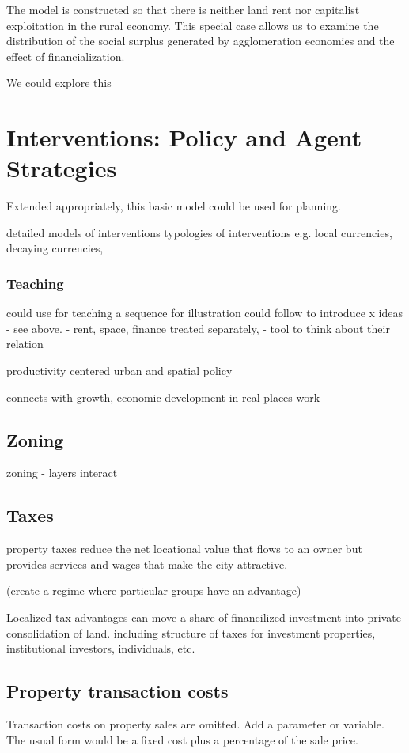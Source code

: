 The model is constructed so that there is neither land rent nor capitalist exploitation in the rural economy. 
This special case allows us to examine the distribution of the social surplus generated by agglomeration economies and the effect of financialization.

We could explore this

\section{Interventions: Policy and Agent Strategies}
Extended appropriately, this basic model could be used for planning.

detailed models of interventions typologies of interventions e.g. local currencies, decaying currencies, 

\subsubsection{Teaching}
could use for teaching a sequence for illustration could follow to introduce x ideas - see above. - rent, space, finance treated separately, - tool to think about their relation

productivity centered urban and spatial policy

connects with growth, economic development in real places work

\subsection{Zoning}
zoning - layers interact

\subsection{Taxes}
property taxes reduce the net locational value that flows to an owner but provides services and wages that make the city attractive. 

(create a regime where particular groups have an advantage)

Localized tax advantages can move a share of financilized investment into private consolidation of land.
including structure of taxes for investment properties, institutional investors, individuals, etc.


\subsection{Property transaction costs}
Transaction costs on property sales are omitted. Add a parameter or variable. 
The usual form  would be a fixed cost  plus a percentage of the sale price.


